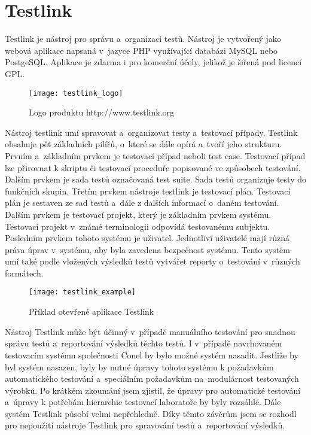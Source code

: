 \section{Testlink}
Testlink je nástroj pro správu a~organizaci testů. Nástroj je vytvořený jako webová aplikace napsaná v~jazyce PHP využívající databázi MySQL nebo PostgeSQL. Aplikace je zdarma i pro komerční účely, jelikož je šiřená pod licencí GPL.

\begin{figure}[h]
  \centering
  \texttt{[image: testlink\_logo]}
  \caption{Logo produktu http://www.testlink.org}
  \label{fig:testlink_logo}
\end{figure}

Nástroj testlink umí spravovat a~organizovat testy a~testovací případy. Testlink obsahuje pět základních pilířů, o~které se dále opírá a~tvoří jeho strukturu. Prvním a~základním prvkem je testovací případ neboli test case. Testovací případ lze přirovnat k skriptu či testovací proceduře popisované ve způsobech testování. Dalším prvkem je sada testů označovaná test suite. Sada testů organizuje testy do funkčních skupin. Třetím prvkem nástroje testlink je testovací plán. Testovací plán je sestaven ze sad testů a~dále z dalších informací o~daném testování. Dalším prvkem je testovací projekt, který je základním prvkem systému. Testovací projekt v~známé terminologii odpovídá testovanému subjektu. Posledním prvkem tohoto systému je uživatel. Jednotliví uživatelé mají různá práva úprav v~systému, aby byla zavedena bezpečnost systému. Tento systém umí také podle vložených výsledků testů vytvářet reporty o~testování v~různých formátech.

\begin{figure}[h]
  \centering
  \texttt{[image: testlink\_example]}
  \caption{Příklad otevřené aplikace Testlink}
  \label{fig:testlink_example}
\end{figure}

Nástroj Testlink může být účinný v~případě manuálního testování pro snadnou správu testů a~reportování výsledků těchto testů. I v~případě navrhovaném testovacím systému společnosti Conel by bylo možné systém nasadit. Jestliže by byl systém nasazen, byly by nutné úpravy tohoto systému k požadavkům automatického testování a~speciálním požadavkům na~modulárnost testovaných výrobků. Po krátkém zkoumání jsem zjistil, že úpravy pro automatické testování a~úpravy k potřebám hierarchie  testovací laboratoře by byly rozsáhlé. Dále systém Testlink působí velmi nepřehledně. Díky těmto závěrům jsem se rozhodl pro nepoužití nástroje Testlink pro spravování testů a~reportování výsledků.

